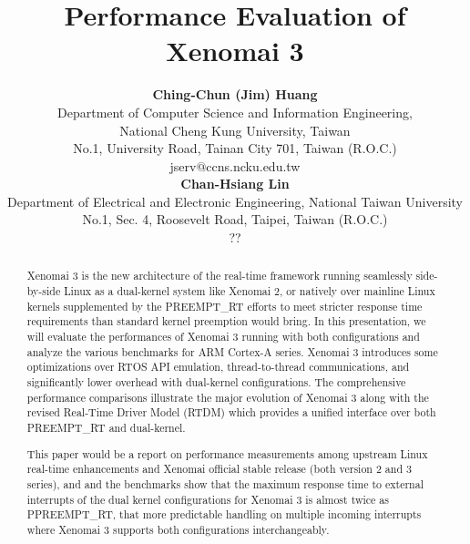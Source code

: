 \documentclass[10pt,a4paper]{article}
\title{\LARGE
Performance Evaluation of Xenomai 3
}
\author{\large
{\bf Ching-Chun (Jim) Huang }\\
Department of Computer Science and Information Engineering, \\
National Cheng Kung University, Taiwan\\
No.1, University Road, Tainan City 701, Taiwan (R.O.C.)\\
\vspace{8mm}
jserv$@$ccns.ncku.edu.tw\\
{\bf Chan-Hsiang Lin}\\
Department of Electrical and Electronic Engineering, National Taiwan University\\
No.1, Sec. 4, Roosevelt Road, Taipei, Taiwan (R.O.C.)\\
??\\
}
\date{}
\begin{document}
\maketitle

\begin{abstract}
Xenomai 3 is the new architecture of the real-time framework running seamlessly side-by-side Linux as a dual-kernel system like Xenomai 2, or natively over mainline Linux kernels supplemented by the PREEMPT\_RT efforts to meet stricter response time requirements than standard kernel preemption would bring. In this presentation, we will evaluate the performances of Xenomai 3 running with both configurations and analyze the various benchmarks for ARM Cortex-A series. Xenomai 3 introduces some optimizations over RTOS API emulation, thread-to-thread communications, and significantly lower overhead with dual-kernel configurations. The comprehensive performance comparisons illustrate the major evolution of Xenomai 3 along with the revised Real-Time Driver Model (RTDM) which provides a unified interface over both PREEMPT\_RT and dual-kernel.

This paper would be a report on performance measurements among upstream Linux real-time enhancements and Xenomai official stable release (both version 2 and 3 series), and and the benchmarks show that the maximum response time to external interrupts of the dual kernel configurations for Xenomai 3 is almost twice as PPREEMPT\_RT, that more predictable handling on multiple incoming interrupts where Xenomai 3 supports both configurations interchangeably.
\end{abstract}

\vspace{10mm}
\end{document}
